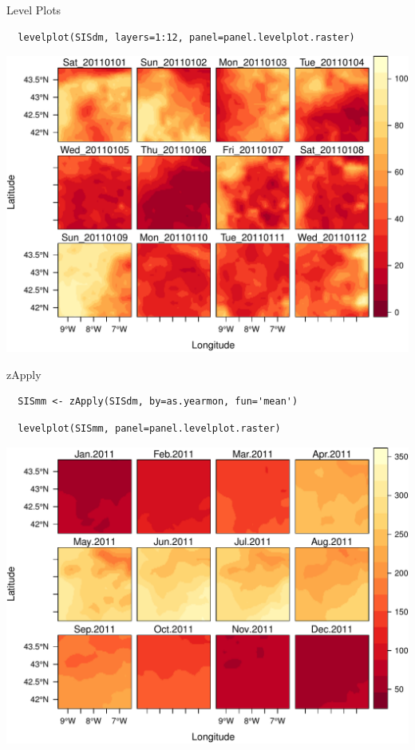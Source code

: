 \documentclass[xcolor={usenames,svgnames,dvipsnames}]{beamer}
\begin{document}
\begin{frame}[fragile,label=sec-4-3]{Level Plots}
 \lstset{language=R,label= ,caption= ,numbers=none}
\begin{lstlisting}
  levelplot(SISdm, layers=1:12, panel=panel.levelplot.raster)
\end{lstlisting}


\includegraphics[width=.9\linewidth]{figs/SISdm.pdf}
\end{frame}

\begin{frame}[fragile,label=sec-4-4]{zApply}
 \lstset{language=R,label= ,caption= ,numbers=none}
\begin{lstlisting}
  SISmm <- zApply(SISdm, by=as.yearmon, fun='mean')
\end{lstlisting}
\end{frame}

\begin{frame}[fragile,label=sec-4-5]{}
 \lstset{language=R,label= ,caption= ,numbers=none}
\begin{lstlisting}
  levelplot(SISmm, panel=panel.levelplot.raster)
\end{lstlisting}

\includegraphics[width=.9\linewidth]{figs/SISmm.pdf}
\end{frame}
\end{document}
